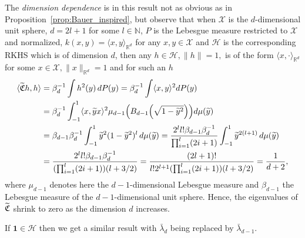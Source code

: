 \documentclass[10pt]{amsart}
\theoremstyle{definition}\newtheorem{defi}[theo]{Definition}\newtheorem{rema}[theo]{Remark}\newtheorem{exam}[theo]{Example}\newtheorem{exem}[theo]{Example}\newtheorem{nota}[theo]{Notation}
\theoremstyle{remark}
\newcommand{\R}{\mathbb{R}}
\newcommand{\bbN}{\mathbb{N}}
\newcommand{\X}{\mathcal{X}}
\newcommand{\cH}{\mathcal{H}}
\newcommand{\fkC}{\mathfrak{C}}
\let\oldtilde\tilde
\renewcommand*{\tilde}[1]{\mathchoice{\widetilde{#1}}{\widetilde{#1}}{\oldtilde{#1}}{\oldtilde{#1}}}
\let\originalleft\left
\let\originalright\right
\renewcommand{\left}{\mathopen{}\mathclose\bgroup\originalleft}
\renewcommand{\right}{\aftergroup\egroup\originalright}
\begin{document}
The \emph{dimension dependence} is in this result not as obvious as in Proposition~\ref{prop:Bauer_inspired}, but observe that when $\X$ is the $d$-dimensional unit sphere, $d =2l +1$ for some $l \in \bbN$, $P$ is the Lebesgue measure restricted to $\X$ and normalized, $k(x,y) = \langle x,y \rangle_{\R^d}$ for any $x,y \in \X$ and $\cH$ is the corresponding RKHS which is of dimension $d$, then any $h \in \cH, \|h\|=1,$ is of the form $\langle x,\cdot \rangle_{\R^d}$ for some $x\in \X,\|x\|_{\R^d}=1$ and for such an $h$
\begin{align*}
\langle \tilde{\fkC} h,h \rangle &= \beta_d^{-1} \int h^2(y) \,dP(y)= \beta_d^{-1} \int \langle x,y\rangle^2  dP(y) \\
&= \beta_d^{-1} \int_{-1}^1 \langle x,\tilde yx\rangle^2 \mu_{d-1}\left(B_{d-1}\left(\sqrt{1-\tilde y^2}\right)\right) d \mu(\tilde y) \\
&= \beta_{d-1}\beta_d^{-1} \int_{-1}^1 \tilde y^2 (1-\tilde y^2)^{l} \,d\mu(\tilde y) =\frac{2^ll! \beta_{d-1}\beta_d^{-1}} {\prod_{i=1}^l (2i +1)}\int_{-1}^1 \tilde y^{2(l+1)} \,d\mu(\tilde y) \\
&= \frac{2^ll! \beta_{d-1}\beta_d^{-1}}{(\prod_{i=1}^l (2i +1))(l+ 3/2)} = \frac{(2l+1)!}{l! 2^{l+1}(\prod_{i=1}^l (2i +1))(l+ 3/2)} = \frac{1}{d+ 2},
\end{align*}
where $\mu_{d-1}$ denotes here the $d-1$-dimensional Lebesgue measure and $\beta_{d-1}$ the Lebesgue measure of the $d-1$-dimensional unit sphere. Hence, the eigenvalues of $\tilde{\fkC}$ shrink to zero as the dimension $d$ increases.

If $\bm 1 \in \cH$ then we get a similar result with $\bar \lambda_d$ being replaced by $\bar \lambda_{d-1}$.
\end{document}
